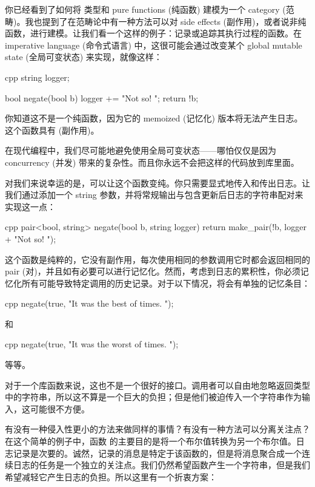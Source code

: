 
\lettrine[lhang=0.17]{你}{已经看到了如何将} 类型和 pure functions (纯函数) 建模为一个 category (范畴)。我也提到了在范畴论中有一种方法可以对 side effects (副作用)，或者说非纯函数，进行建模。让我们看一个这样的例子：记录或追踪其执行过程的函数。在 imperative language (命令式语言) 中，这很可能会通过改变某个 global mutable state (全局可变状态) 来实现，就像这样：

\begin{snip}{cpp}
string logger;

bool negate(bool b) {
    logger += "Not so! ";
    return !b;
}
\end{snip}
你知道这不是一个纯函数，因为它的 memoized (记忆化) 版本将无法产生日志。这个函数具有  (副作用)。

在现代编程中，我们尽可能地避免使用全局可变状态——哪怕仅仅是因为 concurrency (并发) 带来的复杂性。而且你永远不会把这样的代码放到库里面。

对我们来说幸运的是，可以让这个函数变纯。你只需要显式地传入和传出日志。让我们通过添加一个 string 参数，并将常规输出与包含更新后日志的字符串配对来实现这一点：

\begin{snip}{cpp}
pair<bool, string> negate(bool b, string logger) {
    return make_pair(!b, logger + "Not so! ");
}
\end{snip}
这个函数是纯粹的，它没有副作用，每次使用相同的参数调用它时都会返回相同的 pair (对)，并且如有必要可以进行记忆化。然而，考虑到日志的累积性，你必须记忆化所有可能导致特定调用的历史记录。对于以下情况，将会有单独的记忆条目：

\begin{snip}{cpp}
negate(true, "It was the best of times. ");
\end{snip}
和

\begin{snip}{cpp}
negate(true, "It was the worst of times. ");
\end{snip}
等等。

对于一个库函数来说，这也不是一个很好的接口。调用者可以自由地忽略返回类型中的字符串，所以这不算是一个巨大的负担；但是他们被迫传入一个字符串作为输入，这可能很不方便。

有没有一种侵入性更小的方法来做同样的事情？有没有一种方法可以分离关注点？在这个简单的例子中，函数 的主要目的是将一个布尔值转换为另一个布尔值。日志记录是次要的。诚然，记录的消息是特定于该函数的，但是将消息聚合成一个连续日志的任务是一个独立的关注点。我们仍然希望函数产生一个字符串，但是我们希望减轻它产生日志的负担。所以这里有一个折衷方案：

